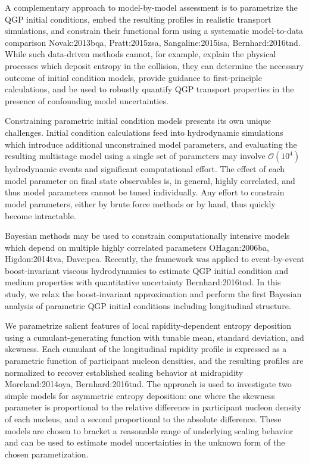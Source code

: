 A complementary approach to model-by-model assessment is to parametrize the QGP initial conditions, embed the resulting profiles in realistic transport simulations, and constrain their functional form using a systematic model-to-data comparison {Novak:2013bqa, Pratt:2015zsa, Sangaline:2015isa, Bernhard:2016tnd}.
While such data-driven methods cannot, for example, explain the physical processes which deposit entropy in the collision, they can determine the necessary outcome of initial condition models, provide guidance to first-principle calculations, and be used to robustly quantify QGP transport properties in the presence of confounding model uncertainties.

Constraining parametric initial condition models presents its own unique challenges.
Initial condition calculations feed into hydrodynamic simulations which introduce additional unconstrained model parameters, and evaluating the resulting multistage model using a single set of parameters may involve $\mathcal{O}(10^4)$ hydrodynamic events and significant computational effort.
The effect of each model parameter on final state observables is, in general, highly correlated, and thus model parameters cannot be tuned individually.
Any effort to constrain model parameters, either by brute force methods or by hand, thus quickly become intractable.

Bayesian methods may be used to constrain computationally intensive models which depend on multiple highly correlated parameters {OHagan:2006ba, Higdon:2014tva, Dave:pca}.
Recently, the framework was applied to event-by-event boost-invariant viscous hydrodynamics to estimate QGP initial condition and medium properties with quantitative uncertainty {Bernhard:2016tnd}.
In this study, we relax the boost-invariant approximation and perform the first Bayesian analysis of parametric QGP initial conditions including longitudinal structure.

We parametrize salient features of local rapidity-dependent entropy deposition using a cumulant-generating function with tunable mean, standard deviation, and skewness.
Each cumulant of the longitudinal rapidity profile is expressed as a parametric function of participant nucleon densities, and the resulting profiles are normalized to recover established scaling behavior at midrapidity {Moreland:2014oya, Bernhard:2016tnd}.
The approach is used to investigate two simple models for asymmetric entropy deposition: one where the skewness parameter is proportional to the relative difference in participant nucleon density of each nucleus, and a second proportional to the absolute difference.
These models are chosen to bracket a reasonable range of underlying scaling behavior and can be used to estimate model uncertainties in the unknown form of the chosen parametization.

